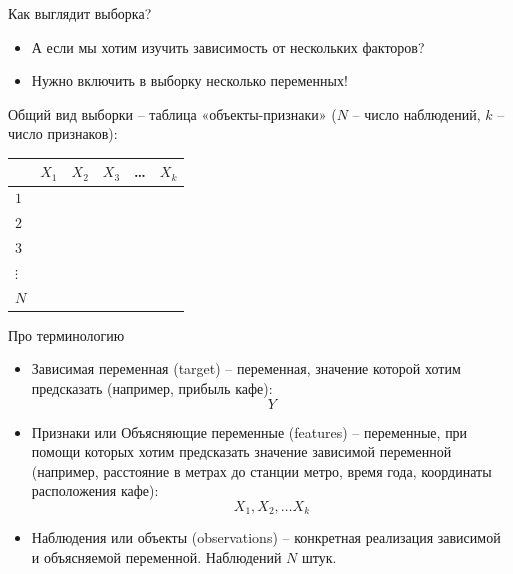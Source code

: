 \documentclass[c, handout]{beamer} %
\begin{document}
	
	\begin{frame}{Как выглядит выборка?}
		\begin{itemize}
			\item А если мы хотим изучить зависимость от нескольких факторов? 
			\item Нужно включить в выборку несколько переменных!
		\end{itemize}
		Общий вид выборки – таблица «объекты-признаки» ($N$ – число наблюдений, $k$ – число признаков):
		\begin{center}
		\def\arraystretch{1.5}
		\begin{tabular}{l| c c c c c}
			\hline
			  & $X_1$ & $X_2$ & $X_3$ & \ldots & $X_k$ \\
			\hline
			$1$ && &&& \\
			$2$ &&&&&\\
			$3$ &&&&& \\
			$\vdots$ &&&&&\\
			$N$ &&&&&\\
		\end{tabular}
		\end{center}
	\end{frame}

	\begin{frame}{Про терминологию}
		\begin{itemize}
			\item<1-> \alert{Зависимая переменная} (target) – переменная, значение которой хотим предсказать (например, прибыль кафе):
			\[
			Y
			\]
			\item<2-> \alert{Признаки} или Объясняющие переменные (features) – переменные, при помощи которых хотим предсказать значение зависимой переменной (например, расстояние в метрах до станции метро, время года, координаты расположения кафе):
			\[
			X_1, X_2, \ldots X_k
			\]
			\item<3-> \alert{Наблюдения} или объекты (observations) – конкретная реализация зависимой и объясняемой переменной. Наблюдений $N$ штук. 
		\end{itemize}
	\end{frame}
\end{document}
